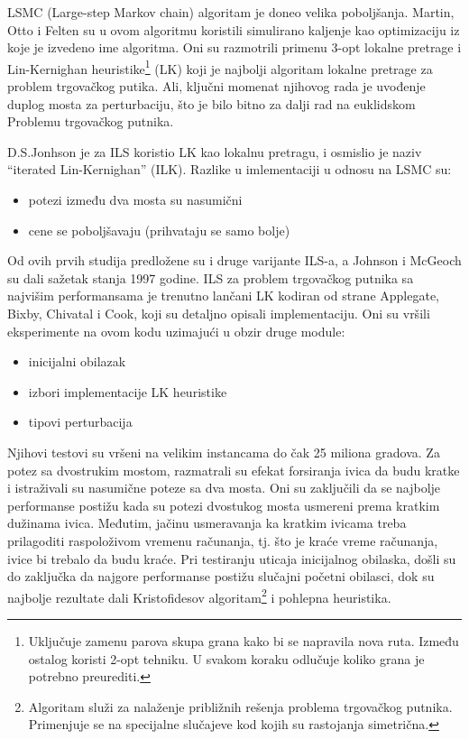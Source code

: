 \documentclass[a4paper]{article}
\newcommand{\q}[1]{``#1''}  %
\begin{document}
LSMC (Large-step Markov chain) algoritam je doneo velika poboljšanja. Martin, Otto i Felten su u ovom algoritmu koristili simulirano kaljenje kao optimizaciju iz koje je izvedeno ime algoritma. Oni su razmotrili primenu 3-opt lokalne pretrage i Lin-Kernighan heuristike\footnote{Uključuje zamenu parova skupa grana kako bi se napravila nova ruta. Između ostalog koristi 2-opt tehniku. U svakom koraku odlučuje koliko grana je potrebno preurediti.} (LK) koji je najbolji algoritam lokalne pretrage za problem trgovačkog putika. Ali, ključni momenat njihovog rada je uvođenje duplog mosta za perturbaciju, što je bilo bitno za dalji rad na euklidskom Problemu trgovačkog putnika.

D.S.Jonhson je za ILS koristio LK kao lokalnu pretragu, i osmislio je naziv \q{iterated Lin-Kernighan} (ILK). Razlike u imlementaciji u odnosu na LSMC su:
\begin{itemize}
  \item potezi između dva mosta su nasumični
  \item cene se poboljšavaju (prihvataju se samo bolje)
\end{itemize}
Od ovih prvih studija predložene su i druge varijante ILS-a, a Johnson i McGeoch su dali sažetak stanja 1997 godine. 
ILS za problem trgovačkog putnika sa najvišim performansama je trenutno lančani LK kodiran od strane Applegate, Bixby, Chivatal i Cook, koji su detaljno opisali implementaciju. Oni su vršili eksperimente na ovom kodu uzimajući u obzir druge module:
\begin{itemize}
  \item inicijalni obilazak
  \item izbori implementacije LK heuristike
  \item tipovi perturbacija
\end{itemize}
Njihovi testovi su vršeni na velikim instancama do čak 25 miliona gradova. Za potez sa dvostrukim mostom, razmatrali su efekat forsiranja ivica da budu kratke i istraživali su nasumične poteze sa dva mosta. Oni su zaključili da se najbolje performanse postižu kada su potezi dvostukog mosta usmereni prema kratkim dužinama ivica. Međutim, jačinu usmeravanja ka kratkim ivicama treba prilagoditi raspoloživom vremenu računanja, tj. što je kraće vreme računanja, ivice bi trebalo da budu kraće. Pri testiranju uticaja inicijalnog obilaska, došli su do zaključka da najgore performanse postižu slučajni početni obilasci, dok su najbolje rezultate dali Kristofidesov algoritam\footnote{Algoritam služi za nalaženje približnih rešenja problema trgovačkog putnika. Primenjuje se na specijalne slučajeve kod kojih su rastojanja simetrična.} i pohlepna heuristika. 
\end{document}
